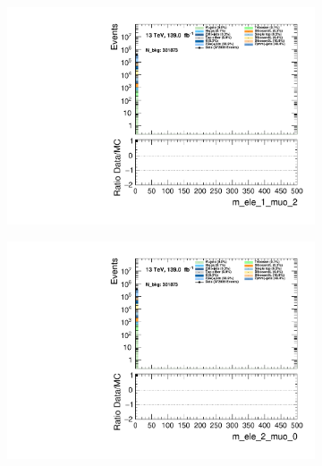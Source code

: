 \begin{figure}
\begin{subfigure}{.49\textwidth}
        \includegraphics[width=\textwidth]{Figures/MC_Data_comp/m_ele_1_muo_2.pdf}
        \caption{ }
        \label{fig:fep}
    \end{subfigure}
    \hfill
    \begin{subfigure}{.49\textwidth}
        \includegraphics[width=\textwidth]{Figures/MC_Data_comp/m_ele_2_muo_0.pdf}
        \caption{ }
        \label{fig:fe}
    \end{subfigure}
    \hfill       
    \caption{}
    \label{fig:t}
\end{figure}

